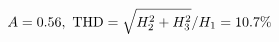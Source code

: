 \documentclass[preview]{standalone}
\begin{document}
\begin{align*}
\special{dvisvgm:raw <g id='unique000'>}A=0.56,\ \text{THD}=\sqrt{H_2^2+H_3^2}/H_1=10.7\%\special{dvisvgm:raw </g>}
\end{align*}
\end{document}
